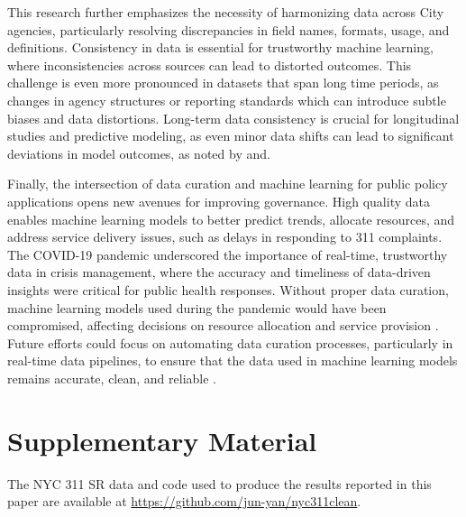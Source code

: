 \documentclass[linenumber]{jdsart}
\begin{document}
This research further emphasizes the necessity of harmonizing data
across City agencies, particularly resolving discrepancies in field
names, formats, usage, and definitions. Consistency in data is essential for
trustworthy machine learning, where inconsistencies across sources can
lead to distorted outcomes. This challenge is even more pronounced in
datasets that span long time periods, as changes in agency structures
or reporting standards which can introduce subtle biases and data 
distortions. Long\mbox{-}term data consistency is crucial for 
longitudinal studies and predictive modeling, as even minor 
data shifts can lead to significant deviations in model outcomes, 
as noted by \citet{rahm2000data} and\citet{borgman2012conundrum}.


Finally, the intersection of data curation and machine learning for
public policy applications opens new avenues for improving governance.
High quality data enables machine learning models to better predict
trends, allocate resources, and address service delivery issues, such
as delays in responding to 311 complaints. The COVID\mbox{-}19 pandemic
underscored the importance of real\mbox{-}time, trustworthy data in crisis
management, where the accuracy and timeliness of data\mbox{-}driven insights
were critical for public health responses. Without proper data
curation, machine learning models used during the pandemic would have
been compromised, affecting decisions on resource allocation and
service provision \citep{worby2020face, khemasuwan2021applications}.
Future efforts could focus on automating data curation processes,
particularly in real\mbox{-}time data pipelines, to ensure that the data used
in machine learning models remains accurate, clean, and reliable
\citep{chu2016data, hurbean2021open}.


\section*{Supplementary Material}
The NYC 311 SR data and code used to produce the results reported in
this paper are available at \url{https://github.com/jun-yan/nyc311clean}.




\end{document}
